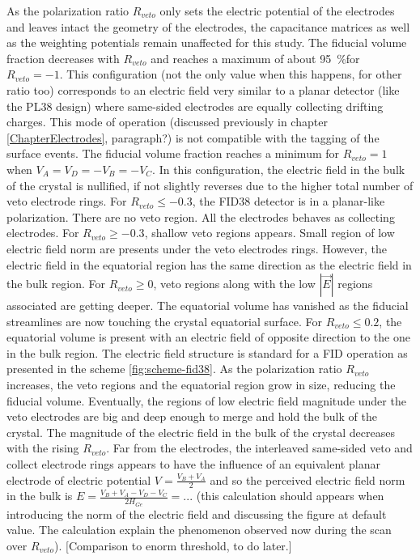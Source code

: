 As the polarization ratio $R_{veto}$ only sets the electric potential of the electrodes and leaves intact the geometry of the electrodes, the capacitance matrices as well as the weighting potentials remain unaffected for this study.
The fiducial volume fraction decreases with $R_{veto}$ and reaches a maximum of about \SI{95}{\percent}for $R_{veto}=-1$. This configuration (not the only value when this happens, for other ratio too) corresponds to an electric field very similar to a planar detector (like the PL38 design) where same-sided electrodes are equally collecting drifting charges. This mode of operation (discussed previously in chapter \ref{ChapterElectrodes}, paragraph?) is not compatible with the tagging of the surface events.
The fiducial volume fraction reaches a minimum for $R_{veto}=1$ when $V_A = V_D = -V_B = -V_C$. In this configuration, the electric field in the bulk of the crystal is nullified, if not slightly reverses due to the higher total number of veto electrode rings.
For $R_{veto} \leq -0.3$, the FID38 detector is in a planar-like polarization. There are no veto region. All the electrodes behaves as collecting electrodes.
For $R_{veto} \geq -0.3$, shallow veto regions appears. Small region of low electric field norm are presents under the veto electrodes rings. However, the electric field in the equatorial region has the same direction as the electric field in the bulk region.
For $R_{veto} \geq 0$, veto regions along with the low $|\vec{E}|$ regions associated are getting deeper. The equatorial volume has vanished as the fiducial streamlines are now touching the crystal equatorial surface. 
For $R_{veto} \leq 0.2$, the equatorial volume is present with an electric field of opposite direction to the one in the bulk region. The electric field structure is standard for a FID operation as presented in the scheme \ref{fig:scheme-fid38}. As the polarization ratio $R_{veto}$ increases, the veto regions and the equatorial region grow in size, reducing the fiducial volume. Eventually, the regions of low electric field magnitude under the veto electrodes are big and deep enough to merge and hold the bulk of the crystal.
The magnitude of the electric field in the bulk of the crystal decreases with the rising $R_{veto}$. Far from the electrodes, the interleaved same-sided veto and collect electrode rings appears to have the influence of an equivalent planar electrode of electric potential $V=\frac{V_B + V_A}{2}$ and so the perceived electric field norm in the bulk is $E = \frac{V_B + V_A - V_D - V_C}{2 H_{Ge}}=...$ (this calculation should appears when introducing the norm of the electric field and discussing the figure at default value. The calculation explain the phenomenon observed now during the scan over $R_{veto}$).
{\color{red} [Comparison to enorm threshold, to do later.]}

